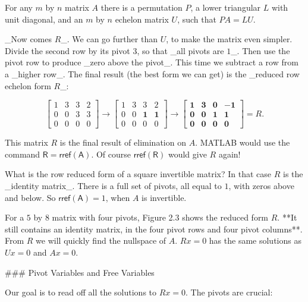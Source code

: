 For any \(m\) by \(n\) matrix \(A\) there is a permutation \(P\), a lower triangular \(L\) with unit diagonal, and an \(m\) by \(n\) echelon matrix \(U\), such that \(PA=LU\).

_Now comes \(R\)_. We can go further than \(U\), to make the matrix even simpler. Divide the second row by its pivot \(3\), so that _all pivots are \(1\)_. Then use the pivot row to produce _zero above the pivot_. This time we subtract a row from a _higher row_. The final result (the best form we can get) is the _reduced row echelon form \(R\)_:

\[\begin{bmatrix}1&3&3&2\\ 0&0&3&3\\ 0&0&0&0\end{bmatrix}\longrightarrow\begin{bmatrix}1&3&3&2\\ 0&0&\mathbf{1}&\mathbf{1}\\ 0&0&0&0\end{bmatrix}\longrightarrow\begin{bmatrix}\mathbf{1}&\mathbf{3}& \mathbf{0}&\mathbf{-1}\\ \mathbf{0}&\mathbf{0}&\mathbf{1}&\mathbf{1}\\ \mathbf{0}&\mathbf{0}&\mathbf{0}&\mathbf{0}\end{bmatrix}=R.\]

This matrix \(R\) is the final result of elimination on \(A\). MATLAB would use the command \(\mathsf{R}=\mathsf{rref}(\mathsf{A})\). Of course \(\mathsf{rref}(\mathsf{R})\) would give \(R\) again!

What is the row reduced form of a square invertible matrix? In that case \(R\) is the _identity matrix_. There is a full set of pivots, all equal to \(1\), with zeros above and below. So \(\mathsf{rref}(\mathsf{A})=1\), when \(A\) is invertible.

For a \(5\) by \(8\) matrix with four pivots, Figure 2.3 shows the reduced form \(R\). **It still contains an identity matrix, in the four pivot rows and four pivot columns**. From \(R\) we will quickly find the nullspace of \(A\). \(Rx=0\) has the same solutions as \(Ux=0\) and \(Ax=0\).

### Pivot Variables and Free Variables

Our goal is to read off all the solutions to \(Rx=0\). The pivots are crucial:

